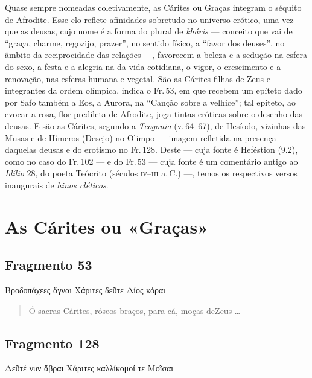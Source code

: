 \begin{argumento}
Quase sempre nomeadas coletivamente, as Cárites ou Graças integram o séquito de Afrodite.
Esse elo reflete afinidades sobretudo no universo erótico, uma vez que as
deusas, cujo nome é a forma do plural de \emph{kháris } --- conceito que vai de
``graça, charme, regozijo, prazer'', no sentido físico, a ``favor dos deuses'', no
âmbito da reciprocidade das relações ---, favorecem a beleza e a sedução na
esfera do sexo, a festa e a alegria na da vida cotidiana, o vigor, o
crescimento e a renovação, nas esferas humana e vegetal. São as Cárites
filhas de Zeus e integrantes da ordem olímpica, indica o Fr.\,53, em que
recebem um epíteto dado por Safo também a Eos, a Aurora, na ``Canção sobre a velhice'';
tal epíteto, ao evocar a rosa, flor predileta de Afrodite, joga tintas eróticas
sobre o desenho das deusas. E são as Cárites, segundo a \emph{Teogonia} (v.\,64--67), de Hesíodo, vizinhas das Musas e de Hímeros (Desejo) no Olimpo --- imagem refletida na presença daquelas deusas e do erotismo no Fr.\,128. Deste --- cuja fonte é Heféstion (9.2), como no caso do Fr.\,102 --- e do
Fr.\,53 --- cuja fonte é um comentário antigo ao \emph{Idílio }28, do poeta
Teócrito (séculos \textsc{iv}--\textsc{iii} a.\,C.) ---, temos os respectivos versos inaugurais de
\emph{hinos cléticos}.
\end{argumento}

\chapter{As Cárites ou «Graças»}


\section{Fragmento 53} 

\begin{gkverse}
Βροδοπάχεες ἄγναι Χάριτες δεῦτε Δίος κόραι
\end{gkverse}

\begin{verse}
Ó sacras Cárites, róseos braços, para cá, moças de\qb{}Zeus \ldots{}
\end{verse}


\section{Fragmento 128} 

\begin{gkverse}
Δεῦτέ νυν ἄβραι Χάριτες καλλίκομοί τε Μοῖσαι
\end{gkverse}

